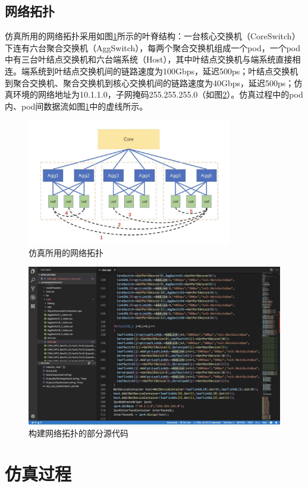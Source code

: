 \subsection{网络拓扑}
仿真所用的网络拓扑采用如图\ref{fig:netw_archi}所示的叶脊结构：一台核心交换机（CoreSwitch）下连有六台聚合交换机（AggSwitch），每两个聚合交换机组成一个pod，一个pod中有三台叶结点交换机和六台端系统（Host），其中叶结点交换机与端系统直接相连。端系统到叶结点交换机间的链路速度为100Gbps，延迟500ps；叶结点交换机到聚合交换机、聚合交换机到核心交换机间的链路速度为40Gbps，延迟500ps；仿真环境的网络地址为10.1.1.0，子网掩码255.255.255.0（如图\ref{fig:code_topo}）。仿真过程中的pod内、pod间数据流如图\ref{fig:netw_archi}中的虚线所示。
\begin{figure}[ht]
\centering
\includegraphics[height=5.5cm]{figure/topo.jpeg}
\caption{仿真所用的网络拓扑}
\label{fig:netw_archi}
\end{figure}

\begin{figure}[ht]
\centering
\includegraphics[height=7cm]{figure/code_topo.png}
\caption{构建网络拓扑的部分源代码}
\label{fig:code_topo}
\end{figure}

\section{仿真过程}

